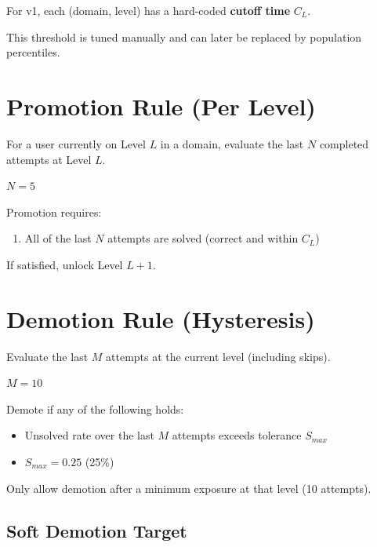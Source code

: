 \documentclass[11pt]{article}
\begin{document}
For v1, each (domain, level) has a hard-coded \textbf{cutoff time} $C_L$.

This threshold is tuned manually and can later be replaced by population percentiles.

\section{Promotion Rule (Per Level)}

For a user currently on Level $L$ in a domain, evaluate the last $N$ completed attempts at Level $L$.

\begin{center}
$N = 5$
\end{center}

Promotion requires:

\begin{enumerate}[leftmargin=*]
    \item All of the last $N$ attempts are solved (correct and within $C_L$)
\end{enumerate}

If satisfied, unlock Level $L + 1$.

\section{Demotion Rule (Hysteresis)}

Evaluate the last $M$ attempts at the current level (including skips).

\begin{center}
$M = 10$
\end{center}

Demote if any of the following holds:

\begin{itemize}[leftmargin=*]
    \item Unsolved rate over the last $M$ attempts exceeds tolerance $S_{max}$
\end{itemize}

\begin{itemize}[leftmargin=*]
    \item $S_{max} = 0.25$ (25\%)
\end{itemize}

Only allow demotion after a minimum exposure at that level (10 attempts).

\subsection*{Soft Demotion Target}
\end{document}
